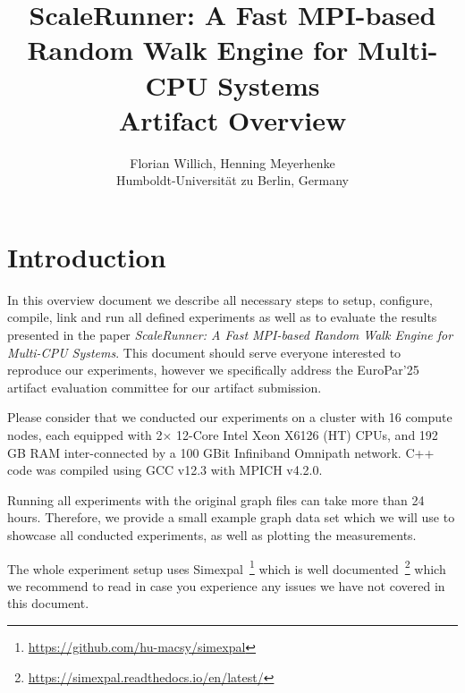 \documentclass[11pt, a4paper]{scrartcl}
\begin{document}
\lstset{  
  tabsize=2, 
  showspaces=false, 
  showstringspaces=false, 
  float=[htb], 
  captionpos=b, 
  basicstyle=\footnotesize, 
  frame=tbrl, %
  frameround=tttt, 
  numbers=left, 
  numberstyle=\tiny, 
  numberblanklines=false, 
  breaklines=true
} 

\title{\small{ScaleRunner: A Fast MPI-based \\ Random Walk Engine for Multi-CPU Systems} \\ \LARGE{Artifact Overview}}

\author{Florian Willich, Henning Meyerhenke \\ Humboldt-Universit\"at zu Berlin, Germany}

\maketitle

\section{Introduction}

In this overview document we describe all necessary steps to setup, configure,
compile, link and run all defined experiments as well as to evaluate the results
presented in the paper \textit{ScaleRunner: A Fast MPI-based Random Walk Engine
for Multi-CPU Systems}. This document should serve everyone interested to
reproduce our experiments, however we specifically address the EuroPar'25
artifact evaluation committee for our artifact submission.

Please consider that we conducted our experiments on a cluster with 16 compute
nodes, each equipped with 2$\times$ 12-Core Intel Xeon X6126 (HT) CPUs, and 192
GB RAM inter-connected by a 100 GBit Infiniband Omnipath network. C++ code was
compiled using GCC v12.3 with MPICH v4.2.0.

Running all experiments with the original graph files can take more than 24
hours. Therefore, we provide a small example graph data set which we will use to
showcase all conducted experiments, as well as plotting the measurements.

The whole experiment setup uses
Simexpal~\footnote{\url{https://github.com/hu-macsy/simexpal}} which is well
documented~\footnote{\url{https://simexpal.readthedocs.io/en/latest/}} which we
recommend to read in case you experience any issues we have not covered in this
document.
\end{document}
